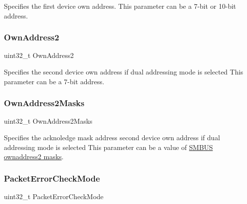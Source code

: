 Specifies the first device own address. This parameter can be a 7-\/bit or 10-\/bit address. \mbox{\label{struct_s_m_b_u_s___init_type_def_a6300c7a7e1b7d5444226a1bd55744f53}} 
\subsubsection{\texorpdfstring{Own\+Address2}{OwnAddress2}}
{\footnotesize\ttfamily uint32\+\_\+t Own\+Address2}

Specifies the second device own address if dual addressing mode is selected This parameter can be a 7-\/bit address. \mbox{\label{struct_s_m_b_u_s___init_type_def_a4fb48639ef769c55e617e6b97e63a531}} 
\subsubsection{\texorpdfstring{Own\+Address2\+Masks}{OwnAddress2Masks}}
{\footnotesize\ttfamily uint32\+\_\+t Own\+Address2\+Masks}

Specifies the acknoledge mask address second device own address if dual addressing mode is selected This parameter can be a value of \hyperlink{group___s_m_b_u_s__own__address2__masks}{S\+M\+B\+US ownaddress2 masks}. \mbox{\label{struct_s_m_b_u_s___init_type_def_a83000ad39e33f28f05cd52e714d72373}} 
\subsubsection{\texorpdfstring{Packet\+Error\+Check\+Mode}{PacketErrorCheckMode}}
{\footnotesize\ttfamily uint32\+\_\+t Packet\+Error\+Check\+Mode}

